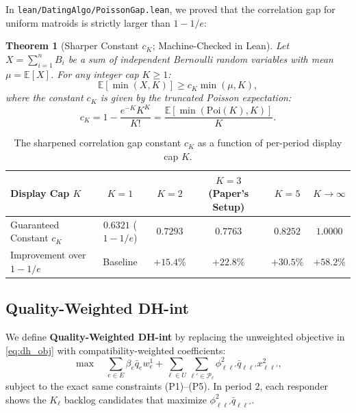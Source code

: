 \documentclass[11pt,letterpaper]{article}
\theoremstyle{definition}
\theoremstyle{plain}
\newtheorem{theorem}{Theorem}[section]
\theoremstyle{remark}
\begin{document}
In \texttt{lean/DatingAlgo/PoissonGap.lean}, we proved that the correlation gap for uniform matroids is strictly larger than $1 - 1/e$:

\begin{theorem}[Sharper Constant $c_K$; Machine-Checked in Lean]
Let $X = \sum_{i=1}^n B_i$ be a sum of independent Bernoulli random variables with mean $\mu = \mathbb{E}[X]$. For any integer cap $K \ge 1$:
\begin{equation}
    \mathbb{E}[\min(X, K)] \ge c_K \min(\mu, K),
\end{equation}
where the constant $c_K$ is given by the truncated Poisson expectation:
\begin{equation}
    c_K = 1 - \frac{e^{-K} K^K}{K!} = \frac{\mathbb{E}[\min(\mathrm{Poi}(K), K)]}{K}.
\end{equation}
\end{theorem}

\begin{table}[ht]
\centering
\begin{tabular}{@{}lccccc@{}}
\toprule
Display Cap $K$ & $K=1$ & $K=2$ & $K=3$ (Paper's Setup) & $K=5$ & $K \to \infty$ \\
\midrule
Guaranteed Constant $c_K$ & $0.6321$ ($1-1/e$) & $0.7293$ & $\mathbf{0.7763}$ & $0.8252$ & $1.0000$ \\
Improvement over $1-1/e$ & Baseline & $+15.4\%$ & $\mathbf{+22.8\%}$ & $+30.5\%$ & $+58.2\%$ \\
\bottomrule
\end{tabular}
\caption{The sharpened correlation gap constant $c_K$ as a function of per-period display cap $K$.}
\label{tab:cK}
\end{table}

\subsection{Quality-Weighted DH-int}
We define \textbf{Quality-Weighted DH-int} by replacing the unweighted objective in \eqref{eq:dh_obj} with compatibility-weighted coefficients:
\begin{equation}
    \max \quad \sum_{e \in E} \beta_e \bar{q}_e w_e^1 + \sum_{\ell \in U} \sum_{\ell' \in \mathcal{P}_\ell} \phi_{\ell\ell'}^2 \bar{q}_{\ell\ell'} x_{\ell\ell'}^2,
\end{equation}
subject to the exact same constraints (P1)–(P5). In period 2, each responder shows the $K_\ell$ backlog candidates that maximize $\phi_{\ell\ell'}^2 \bar{q}_{\ell\ell'}$.
\end{document}
